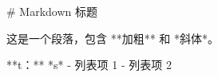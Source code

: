 \documentclass[12pt,a4paper,oneside]{article}
\begin{document}
\begin{markdown}
# Markdown 标题

这是一个段落，包含 **加粗** 和 *斜体*。

**t：**
*s*
- 列表项 1
- 列表项 2

\end{markdown}
\end{document}
